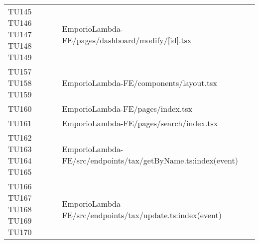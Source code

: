 {\begin{longtable}{C{2cm} C{12.8cm}}
TU145 \newline TU146 \newline TU147 \newline TU148 \newline TU149 & EmporioLambda-FE/pages/dashboard/modify/[id].tsx\\



TU157 \newline TU158 \newline TU159 & EmporioLambda-FE/components/layout.tsx\\

TU160 & EmporioLambda-FE/pages/index.tsx\\

TU161 & EmporioLambda-FE/pages/search/index.tsx\\

TU162 \newline TU163 \newline TU164 \newline TU165 & EmporioLambda-FE/src/endpoints/tax/getByName.ts:index(event)\\

TU166 \newline TU167 \newline TU168 \newline TU169 \newline TU170 & EmporioLambda-FE/src/endpoints/tax/update.ts:index(event)\\





\end{longtable}

}

